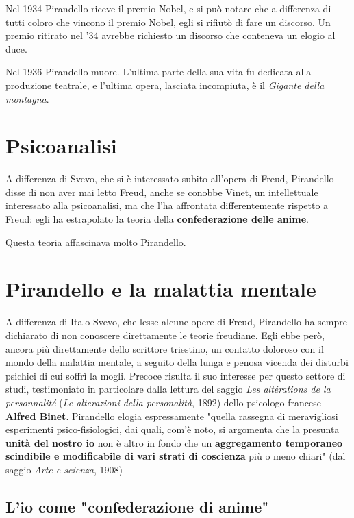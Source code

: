 \documentclass[a4paper, twoside, titlepage]{book}
\begin{document}
Nel 1934 Pirandello riceve il premio Nobel, e si può notare che a differenza di tutti coloro che vincono il premio Nobel, egli si rifiutò di fare un discorso.
Un premio ritirato nel '34 avrebbe richiesto un discorso che conteneva un elogio al duce.

Nel 1936 Pirandello muore. L'ultima parte della sua vita fu dedicata alla produzione teatrale, e l'ultima opera, lasciata incompiuta, è il \textit{Gigante della montagna}.

\section{Psicoanalisi}

A differenza di Svevo, che si è interessato subito all'opera di Freud, Pirandello disse di non aver mai letto Freud, anche se conobbe Vinet, un intellettuale interessato alla psicoanalisi, ma che l'ha affrontata differentemente rispetto a Freud: egli ha estrapolato la teoria della \textbf{confederazione delle anime}.

Questa teoria affascinava molto Pirandello.

\section{Pirandello e la malattia mentale}

A differenza di Italo Svevo, che lesse alcune opere di Freud, Pirandello ha sempre dichiarato di non conoscere direttamente le teorie freudiane. Egli ebbe però, ancora più direttamente dello scrittore triestino, un contatto doloroso con il mondo della malattia mentale, a seguito della lunga e penosa vicenda dei disturbi psichici di cui soffrì la mogli. Precoce risulta il suo interesse per questo settore di studi, testimoniato in particolare dalla lettura del saggio \textit{Les altérations de la personnalité} (\textit{Le alterazioni della personalità}, 1892) dello psicologo francese \textbf{Alfred Binet}. Pirandello elogia espressamente "quella rassegna di meravigliosi esperimenti psico-fisiologici, dai quali, com'è noto, si argomenta che la presunta \textbf{unità del nostro io} non è altro in fondo che un \textbf{aggregamento temporaneo scindibile e modificabile di vari strati di coscienza} più o meno chiari" (dal saggio \textit{Arte e scienza}, 1908)

\subsection{L'io come "confederazione di anime"}
\end{document}
